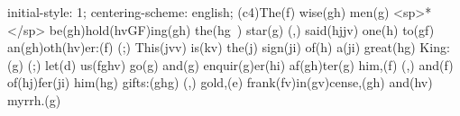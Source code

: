 initial-style: 1;
centering-scheme: english;
(c4)The(f) wise(gh) men(g) <sp>*</sp> be(gh)hold(hvGF)ing(gh) the(hg~) star(g) (,) said(hjjv) one(h) to(gf) an(gh)oth(hv)er:(f) (;) This(jvv) is(kv) the(j) sign(ji) of(h) a(ji) great(hg) King:(g) (;) let(d) us(fghv) go(g) and(g) enquir(g)er(hi) af(gh)ter(g) him,(f) (,) and(f) of(hj)fer(ji) him(hg) gifts:(ghg) (,) gold,(e) frank(fv)in(gv)cense,(gh) and(hv) myrrh.(g)